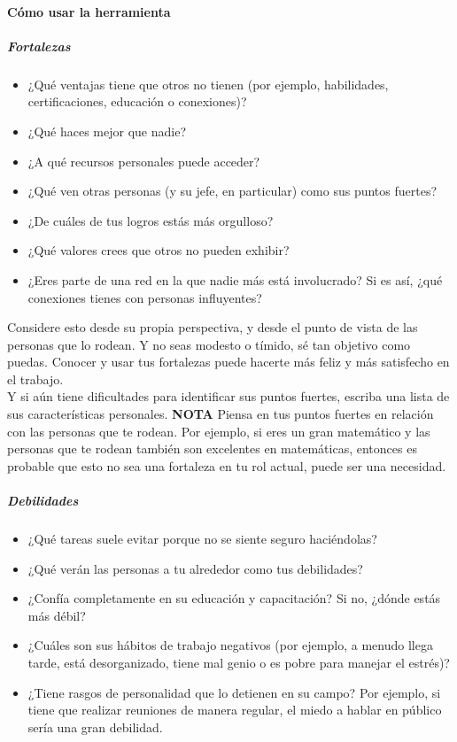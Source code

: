 \documentclass[10pt]{book}
\begin{document}
\paragraph{Cómo usar la herramienta}
\subparagraph{Fortalezas}
\begin{center}
\begin{itemize}
\item ¿Qué ventajas tiene que otros no tienen (por ejemplo, habilidades, certificaciones, educación o conexiones)?
\item ¿Qué haces mejor que nadie?
\item ¿A qué recursos personales puede acceder?
\item ¿Qué ven otras personas (y su jefe, en particular) como sus puntos fuertes?
\item ¿De cuáles de tus logros estás más orgulloso?
\item ¿Qué valores crees que otros no pueden exhibir?
\item ¿Eres parte de una red en la que nadie más está involucrado? Si es así, ¿qué conexiones tienes con personas influyentes?
\end{itemize}
\end{center}
Considere esto desde su propia perspectiva, y desde el punto de vista de las personas que lo rodean. Y no seas modesto o tímido, sé tan objetivo como puedas. Conocer y usar tus fortalezas puede hacerte más feliz y más satisfecho en el trabajo.\\
Y si aún tiene dificultades para identificar sus puntos fuertes, escriba una lista de sus características personales.
\textbf{NOTA} Piensa en tus puntos fuertes en relación con las personas que te rodean. Por ejemplo, si eres un gran matemático y las personas que te rodean también son excelentes en matemáticas, entonces es probable que esto no sea una fortaleza en tu rol actual, puede ser una necesidad.
\subparagraph{Debilidades}
\begin{itemize}
\item ¿Qué tareas suele evitar porque no se siente seguro haciéndolas?
\item ¿Qué verán las personas a tu alrededor como tus debilidades?
\item ¿Confía completamente en su educación y capacitación? Si no, ¿dónde estás más débil?
\item ¿Cuáles son sus hábitos de trabajo negativos (por ejemplo, a menudo llega tarde, está desorganizado, tiene mal genio o es pobre para manejar el estrés)?
\item ¿Tiene rasgos de personalidad que lo detienen en su campo? Por ejemplo, si tiene que realizar reuniones de manera regular, el miedo a hablar en público sería una gran debilidad.
\end{itemize}
\end{document}
